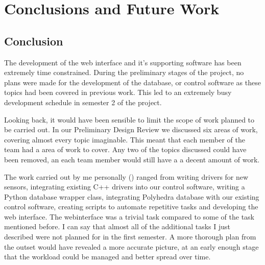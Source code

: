 \section{Conclusions and Future Work}

\subsection{Conclusion}
The development of the web interface and it's supporting software has been extremely time constrained. During the preliminary stages of the project, no plans were made for the development of the database, or control software as these topics had been covered in previous work. This led to an extremely busy development schedule in semester 2 of the project.

Looking back, it would have been sensible to limit the scope of work planned to be carried out. In our Preliminary Design Review \cite{tibby-lit-review} we discussed six areas of work, covering almost every topic imaginable. This meant that each member of the team had a area of work to cover. Any two of the topics discussed could have been removed, an each team member would still have a a decent amount of work.

The work carried out by me personally (\cameron) ranged from writing drivers for new sensors, integrating existing C++ drivers into our control software, writing a Python database wrapper class, integrating Polyhedra database with our existing control software, creating scripts to automate repetitive tasks and developing the web interface. The \gls{webinterface} was a trivial task compared to some of the task mentioned before. I can say that almost all of the additional tasks I just described were not planned for in the first semester. A more thorough plan from the outset would have revealed a more accurate picture, at an early enough stage that the workload could be managed and better spread over time.



